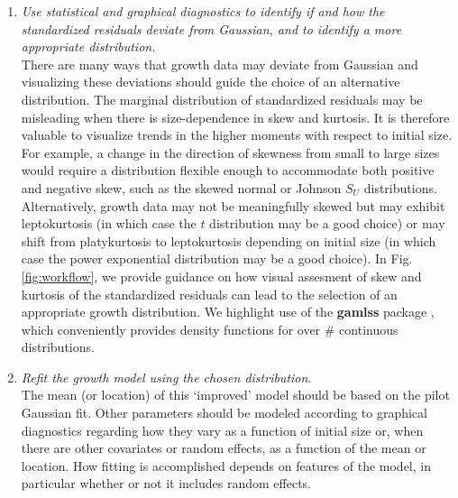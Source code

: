 \documentclass[11pt]{article}
\newcommand{\new}{\textcolor{red}}
\begin{document}
{\begin{enumerate}
\item \textit{Use statistical and graphical diagnostics to identify if and how the standardized residuals deviate from Gaussian, and to identify a more appropriate distribution.}
\\
There are many ways that growth data may deviate from Gaussian and visualizing these deviations should guide the choice of an alternative distribution. 
The marginal distribution of standardized residuals may be misleading when there is size-dependence in skew and kurtosis. 
It is therefore valuable to visualize trends in the higher moments with respect to initial size. 
For example, a change in the direction of skewness from small to large sizes would require a distribution flexible enough to accommodate both positive and negative skew, such as the skewed normal or Johnson $S_{U}$ distributions. 
Alternatively, growth data may not be meaningfully skewed but may exhibit leptokurtosis (in which case the $t$ distribution may be a good choice) or may shift from platykurtosis to leptokurtosis depending on initial size (in which case the power exponential distribution may be a good choice). 
In  Fig. \ref{fig:workflow}, we provide guidance on how visual assesment of skew and kurtosis of the standardized residuals can lead to the selection of an appropriate growth distribution.
We highlight use of the \textbf{gamlss} package \citep{stasinopoulos2007generalized}, which conveniently provides density functions for over \# continuous distributions. 

\item \textit{Refit the growth model using the chosen distribution.}
\\
The mean (or location) of this `improved' model should be based on the pilot Gaussian fit. 
Other parameters should be modeled according to graphical diagnostics regarding how they vary as a function of initial size or, when there are other covariates or random effects, as a function of the mean or location.
How fitting is accomplished depends on features of the model, in particular whether or not it
includes random effects. 


\end{enumerate}}
\end{document}
